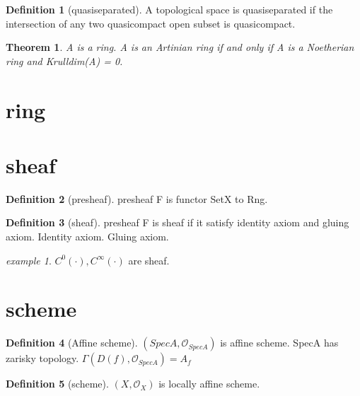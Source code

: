 \documentclass{article}
\theoremstyle{definition} %
\newtheorem{definition}{Definition}[section] %
\theoremstyle{plain} %
\newtheorem{theorem}{Theorem}[section]   %
\theoremstyle{remark} %
\newtheorem{example}{example}[section]     %
\begin{document}
\begin{definition}[quasiseparated]
  A topological space is quasiseparated if the intersection of any two quasicompact open subset is quasicompact.
\end{definition}

\begin{theorem}
  A is a ring. A is an Artinian ring if and only if A is a Noetherian ring and Krulldim(A) = 0.
\end{theorem}

\section{ring}
\section{sheaf}
\begin{definition}[presheaf]
  presheaf F is functor SetX to Rng.
\end{definition}
\begin{definition}[sheaf]
  presheaf F is sheaf if it satisfy identity axiom and gluing axiom.
  Identity axiom.
  Gluing axiom.
\end{definition}

\begin{example}
  $C^0(\cdot), C^\infty(\cdot)$ are sheaf.
\end{example}

\section{scheme}
\begin{definition}[Affine scheme]
  $(SpecA,\mathcal{O}_{SpecA})$ is affine scheme.
  SpecA has zarisky topology.
  $\Gamma(D(f),\mathcal{O}_{SpecA}) = A_f$
\end{definition}


\begin{definition}[scheme]
  $(X,\mathcal{O}_X)$ is locally affine scheme.
\end{definition}
\end{document}
